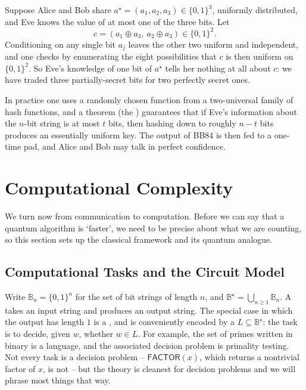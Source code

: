 \documentclass[a4paper]{scrartcl}
\newcommand{\bits}[1]{\mathbb{B}_{#1}}
\begin{document}
\begin{example}
	Suppose Alice and Bob share $a^\star = (a_1,a_2,a_3) \in\{0,1\}^3$, uniformly distributed, and Eve knows the value of at most one of the three bits. Let
	$$c = \left(a_1\oplus a_3,\ a_2\oplus a_3\right) \in \{0,1\}^2.$$
	Conditioning on any single bit $a_j$ leaves the other two uniform and independent, and one checks by enumerating the eight possibilities that $c$ is then uniform on $\{0,1\}^2$. So Eve's knowledge of one bit of $a^\star$ tells her nothing at all about $c$: we have traded three partially-secret bits for two perfectly secret ones.
\end{example}

In practice one uses a randomly chosen function from a two-universal family of hash functions, and a theorem (the ) guarantees that if Eve's information about the $n$-bit string is at most $t$ bits, then hashing down to roughly $n - t$ bits produces an essentially uniform key. The output of BB84 is then fed to a one-time pad, and Alice and Bob may talk in perfect confidence.

\section{Computational Complexity}

We turn now from communication to computation. Before we can say that a quantum algorithm is `faster', we need to be precise about what we are counting, so this section sets up the classical framework and its quantum analogue.

\subsection{Computational Tasks and the Circuit Model}

Write $\bits{n} = \{0,1\}^n$ for the set of bit strings of length $n$, and $\mathbb B^\star = \bigcup_{n\geq1}\bits{n}$. A  takes an input string and produces an output string. The special case in which the output has length $1$ is a , and is conveniently encoded by a  $L\subseteq\mathbb B^\star$: the task is to decide, given $w$, whether $w\in L$. For example, the set of primes written in binary is a language, and the associated decision problem is primality testing. Not every task is a decision problem -- $\mathsf{FACTOR}(x)$, which returns a nontrivial factor of $x$, is not -- but the theory is cleanest for decision problems and we will phrase most things that way.
\end{document}
